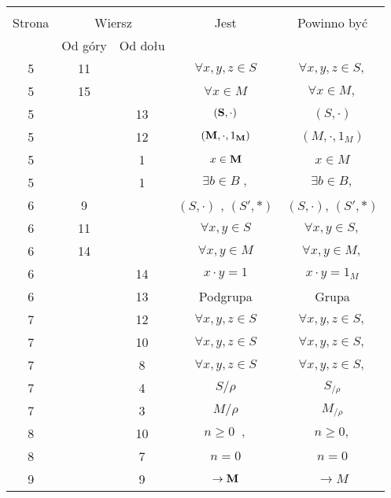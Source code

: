\documentclass[a4paper,11pt]{article}
\begin{document}
\begin{center}

  \begin{tabular}{|c|c|c|c|c|}
    \hline
    & \multicolumn{2}{c|}{} & & \\
    Strona & \multicolumn{2}{c|}{Wiersz} & Jest
                              & Powinno być \\ \cline{2-3}
    & Od góry & Od dołu & & \\
    \hline
    5  & 11 & & $\forall x, y, z \in S$ & $\forall x, y, z \in S,$ \\
    5  & 15 & & $\forall x \in M$ & $\forall x \in M,$ \\
    5  & & 13 & $( \textrm{\textbf{S}}, \cdot )$ & $( S, \cdot )$ \\
    5  & & 12 & $( \textrm{\textbf{M}}, \cdot, 1_{ \textrm{\textbf{M}}} )$
           & $( M, \cdot, 1_{ M } )$ \\
    5  & &  1 & $x \in \textrm{\textbf{M}}$ & $x \in M$ \\
    5  & &  1 & $\exists b \in B\; ,$ & $\exists b \in B,$ \\
    6  &  9 & & $( S, \cdot )${ }, { }{ }$( S', \ast )$
           & $( S, \cdot )$, $( S', \ast )$ \\
    6  & 11 & & $\forall x, y \in S$ & $\forall x, y \in S,$ \\
    6  & 14 & & $\forall x, y \in M$ & $\forall x, y \in M,$ \\
    6  & & 14 & $x \cdot y = 1$ & $x \cdot y = 1_{ M }$ \\
    6  & & 13 & Podgrupa & Grupa \\
    7  & & 12 & $\forall x, y, z \in S$ & $\forall x, y, z \in S,$ \\
    7  & & 10 & $\forall x, y, z \in S$ & $\forall x, y, z \in S,$ \\
    7  & &  8 & $\forall x, y, z \in S$ & $\forall x, y, z \in S,$ \\
    7  & &  4 & $S / \rho$ & $S_{ / \rho }$ \\
    7  & &  3 & $M / \rho$ & $M_{ / \rho }$ \\
    8  & & 10 & $n \geq 0\;\;,$ & $n \geq 0,$ \\
    8  & &  7 & $n \!\! = \!\! 0$ & $n = 0$ \\
    9  & &  9 & $\to \textrm{\textbf{M}}$ & $\to M$ \\
    \hline
  \end{tabular}

\end{center}
\end{document}
